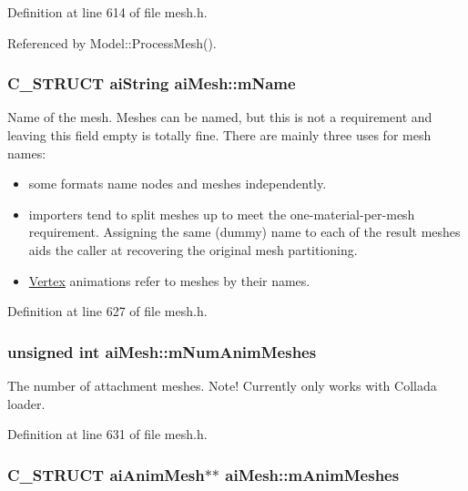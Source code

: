 Definition at line 614 of file mesh.h.

Referenced by Model::ProcessMesh().\hypertarget{structai_mesh_8dd9433e0c5b008e3e5aee6c801d3b74}{
\subsubsection[mName]{\setlength{\rightskip}{0pt plus 5cm}C\_\-STRUCT {\bf aiString} {\bf aiMesh::mName}}}
\label{structai_mesh_8dd9433e0c5b008e3e5aee6c801d3b74}


Name of the mesh. Meshes can be named, but this is not a requirement and leaving this field empty is totally fine. There are mainly three uses for mesh names:\begin{itemize}
\item some formats name nodes and meshes independently.\item importers tend to split meshes up to meet the one-material-per-mesh requirement. Assigning the same (dummy) name to each of the result meshes aids the caller at recovering the original mesh partitioning.\item \hyperlink{class_vertex}{Vertex} animations refer to meshes by their names. \end{itemize}


Definition at line 627 of file mesh.h.\hypertarget{structai_mesh_1692a300222b32348ae51779df4a697e}{
\subsubsection[mNumAnimMeshes]{\setlength{\rightskip}{0pt plus 5cm}unsigned int {\bf aiMesh::mNumAnimMeshes}}}
\label{structai_mesh_1692a300222b32348ae51779df4a697e}


The number of attachment meshes. Note! Currently only works with Collada loader. 

Definition at line 631 of file mesh.h.\hypertarget{structai_mesh_5078f7db7e99ed05db89dfa412f0e990}{
\subsubsection[mAnimMeshes]{\setlength{\rightskip}{0pt plus 5cm}C\_\-STRUCT {\bf aiAnimMesh}$\ast$$\ast$ {\bf aiMesh::mAnimMeshes}}}
\label{structai_mesh_5078f7db7e99ed05db89dfa412f0e990}


